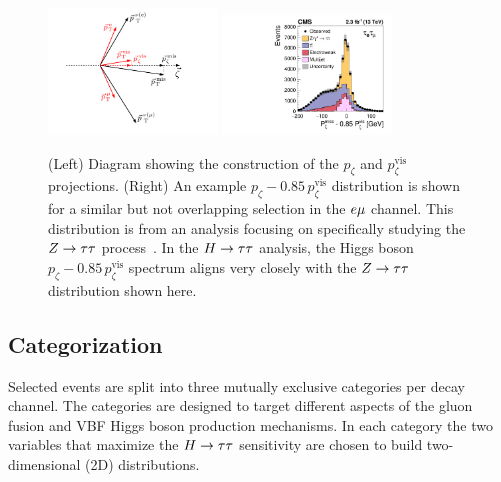 \begin{figure}[htbp]
\centering
     \includegraphics[width=0.4\textwidth]{higgs_to_taus/plots/pZeta_def.pdf}
     \includegraphics[width=0.4\textwidth]{higgs_to_taus/plots/htt_em_pZeta.pdf}\\
     \caption{
(Left) Diagram showing the construction of the $p_\zeta$ and $p_\zeta^{\text{vis}}$ projections.
(Right) An example $p_\zeta - 0.85 \, p_\zeta^{\text{vis}}$ distribution is shown for a similar but not
overlapping selection in the $e\mu$ channel.  This distribution is from an analysis focusing on specifically studying the
$Z\to\tau\tau$ process~\cite{Sirunyan:2018qio}.
In the $H\to\tau\tau$ analysis, the Higgs boson $p_\zeta - 0.85 \, p_\zeta^{\text{vis}}$
spectrum aligns very closely with the $Z\to\tau\tau$ distribution shown here.
     }
     \label{fig:htt_pZeta}
\end{figure}

\subsection{Categorization}
\label{sec:htt_categorization}

Selected events are split into three mutually exclusive categories per decay channel.
The categories are designed to target different aspects of the gluon fusion and VBF Higgs boson production mechanisms.
In each category the two variables that maximize the $H\to\tau\tau$ sensitivity are chosen to build 
two-dimensional (2D) distributions.

